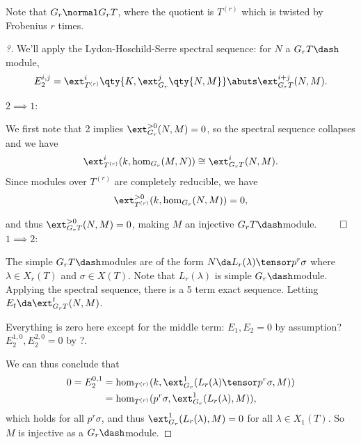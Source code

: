Note that \(G_r \normal G_r T\), where the quotient is \(T^{(r)}\) which
is twisted by Frobenius \(r\) times.

\begin{proof}[?]

We'll apply the Lydon-Hoschild-Serre spectral sequence: for \(N\) a
\(G_r T\dash\)module,
\begin{align*}  
E_2^{i, j} = \ext_{T^{(r)}}^{i}\qty{K, \ext_{G_r}^j\qty{N, M} } \abuts \ext_{G_r T}^{i+j}(N, M)
.\end{align*}

\(2\implies 1\):

We first note that 2 implies \(\ext_{G_r}^{>0}(N, M) = 0\), so the
spectral sequence collapses and we have
\begin{align*}  
\ext_{T^{(r)}}^i (k, \hom_{G_r}(M, N) ) \cong \ext_{G_r T}^i(N, M)
.\end{align*} Since modules over \(T^{(r)}\) are completely reducible,
we have
\begin{align*}  
\ext_{T^{(r)}}^{>0} ( k, \hom_{G_r}(N, M) ) = 0
,\end{align*}

and thus \(\ext_{G_r T}^{>0}(N, M) = 0\), making \(M\) an injective
\(G_r T\dash\)module. \(\qed\)\\

\(1\implies 2\):

The simple \(G_r T\dash\)modules are of the form
\(N\da L_r(\lambda) \tensor p^r\sigma\) where \(\lambda\in X_r(T)\) and
\(\sigma\in X(T)\). Note that \(L_r(\lambda)\) is simple
\(G_r\dash\)module. Applying the spectral sequence, there is a 5 term
exact sequence. Letting \(E_t \da \ext_{G_rT}^t (N, M)\).

\begin{center}\end{center}

Everything is zero here except for the middle term: \(E_1, E_2 = 0\) by
assumption? \(E_2^{1, 0}, E_2^{2, 0} = 0\) by ?.

We can thus conclude that
\begin{align*}  
0 = E_2^{0, 1}
&= \hom_{T^{(r)}}(k, \ext_{G_r}^1 (L_r(\lambda) \tensor p^r\sigma, M)  ) \\ 
&= \hom_{T^{(r)}}(p^r\sigma, \ext_{G_r}^1 (L_r(\lambda), M)  ) 
,\end{align*} which holds for all \(p^r \sigma\), and thus
\(\ext_{G_r}^1 (L_r(\lambda), M) = 0\) for all \(\lambda\in X_1(T)\). So
\(M\) is injective as a \(G_r\dash\)module.

\end{proof}

